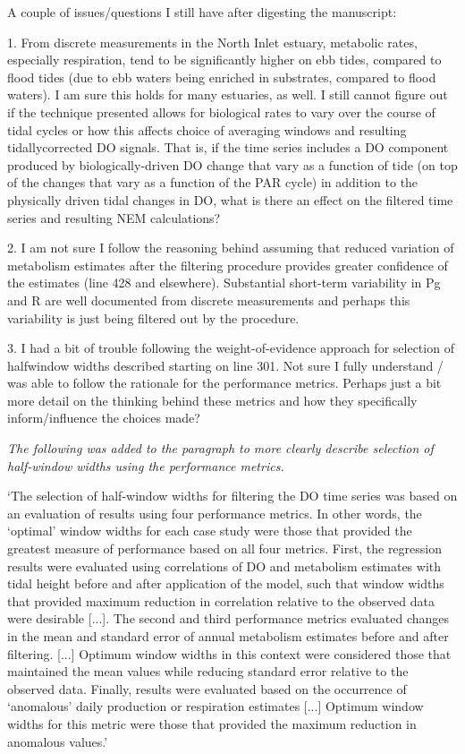 \documentclass[letterpaper,12pt]{article}\usepackage[]{graphicx}\usepackage[]{color}
\begin{document}
A couple of issues/questions I still have after digesting the manuscript:

1. From discrete measurements in the North Inlet estuary, metabolic rates, especially respiration, tend to be significantly higher on ebb tides, compared to flood tides (due to ebb waters being enriched in substrates, compared to flood waters). I am sure this holds for many estuaries, as well. I still cannot figure out if the technique presented allows for biological rates to vary over the course of tidal cycles or how this affects choice of averaging windows and resulting tidallycorrected DO signals. That is, if the time series includes a DO component produced by biologically-driven DO change that vary as a function of tide (on top of the changes that vary as a function of the PAR cycle) in addition to the physically driven tidal changes in DO, what is there an effect on the filtered time series and resulting NEM calculations?

2. I am not sure I follow the reasoning behind assuming that reduced variation of metabolism estimates after the filtering procedure provides greater confidence of the estimates (line 428 and elsewhere). Substantial short-term variability in Pg and R are well documented from discrete measurements and perhaps this variability is just being filtered out by the procedure.

3. I had a bit of trouble following the weight-of-evidence approach for selection of halfwindow widths described starting on line 301. Not sure I fully understand / was able to follow the rationale for the performance metrics. Perhaps just a bit more detail on the thinking behind these metrics and how they specifically inform/influence the choices made?

{\it The following was added to the paragraph to more clearly describe selection of half-window widths using the performance metrics.

`The selection of half-window widths for filtering the DO time series was based on an evaluation of results using four performance metrics.  In other words, the `optimal' window widths for each case study were those that provided the greatest measure of performance based on all four metrics.  First, the regression results were evaluated using correlations of DO and metabolism estimates with tidal height before and after application of the model, such that window widths that provided maximum reduction in correlation relative to the observed data were desirable [...]. The second and third performance metrics evaluated changes in the mean and standard error of annual metabolism estimates before and after filtering.  [...] Optimum window widths in this context were considered those that maintained the mean values while reducing standard error relative to the observed data. Finally, results were evaluated based on the occurrence of `anomalous' daily production or respiration estimates [...] Optimum window widths for this metric were those that provided the maximum reduction in anomalous values.'
}
\end{document}
